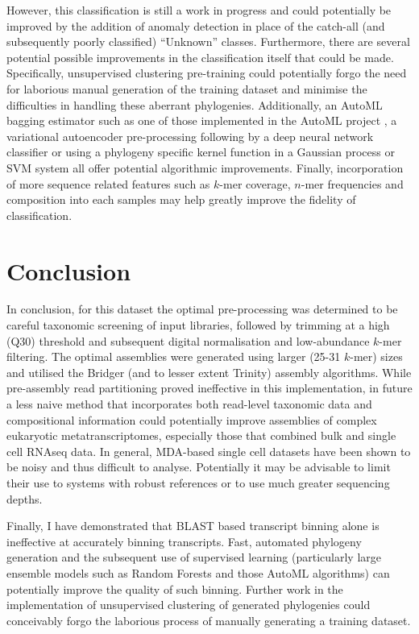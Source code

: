 However, this classification
is still a work in progress and could potentially be improved by the 
addition of anomaly detection in place of the catch-all (and subsequently poorly classified)
``Unknown'' classes.  Furthermore, there are several potential possible improvements
in the classification itself that could be made.
Specifically, unsupervised clustering pre-training could potentially
forgo the need for laborious manual generation of the training dataset and minimise 
the difficulties in handling these aberrant phylogenies.
Additionally, an AutoML bagging estimator such as one of those implemented in the AutoML project \citep{Eggensperger2013}, 
a variational autoencoder pre-processing following by a 
deep neural network classifier or using a phylogeny specific kernel 
function \citep{Vert2002} in a Gaussian process or
SVM system all offer potential algorithmic improvements.
Finally, incorporation of more sequence related features such as
\(k\)-mer coverage, \(n\)-mer frequencies and composition into each samples may help greatly improve
the fidelity of classification.

\section{Conclusion}
In conclusion, for this dataset the optimal pre-processing
was determined to be careful taxonomic screening of input libraries,
followed by trimming at a high (Q30) threshold and subsequent
digital normalisation and low-abundance \(k\)-mer filtering. 
The optimal assemblies were generated using larger (25-31 \(k\)-mer)
sizes and utilised the Bridger (and to lesser extent Trinity)
assembly algorithms.  While pre-assembly read partitioning proved 
ineffective in this implementation, in future a less naive
method that incorporates both read-level taxonomic data and
compositional information could potentially improve assemblies of 
complex eukaryotic metatranscriptomes, especially those that
combined bulk and single cell RNAseq data.  In general, 
MDA-based single cell datasets have been shown to be noisy and thus difficult to 
analyse.
Potentially it may be advisable to limit
their use to systems with robust references or 
to use much greater sequencing depths.

Finally, I have demonstrated that BLAST based transcript binning alone is
ineffective at accurately binning transcripts. Fast, automated phylogeny generation
and the subsequent use of supervised learning (particularly
large ensemble models such as Random Forests and those AutoML algorithms)
can potentially improve the quality of such binning.  Further work 
in the implementation of unsupervised clustering of generated phylogenies
could conceivably forgo the laborious process of manually generating
a training dataset.

